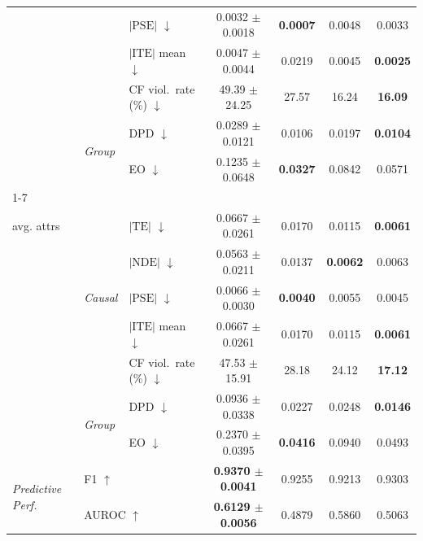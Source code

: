 \begin{table}[t]
\begin{tabular}{@{}lll cccc@{}}
  & & $|\mathrm{PSE}|$ $\downarrow$ & 0.0032 $\pm$ 0.0018 & \textbf{0.0007} & 0.0048 & 0.0033 \\
  & & $|\mathrm{ITE}|$ mean $\downarrow$ & 0.0047 $\pm$ 0.0044 & 0.0219 & 0.0045 & \textbf{0.0025} \\
  & & CF viol.\ rate (\%) $\downarrow$ & 49.39 $\pm$ 24.25 & 27.57 & 16.24 & \textbf{16.09} \\
  & \multirow{2}{*}{\scriptsize\textit{Group}} & DPD $\downarrow$ & 0.0289 $\pm$ 0.0121 & 0.0106 & 0.0197 & \textbf{0.0104} \\
  & & EO $\downarrow$ & 0.1235 $\pm$ 0.0648 & \textbf{0.0327} & 0.0842 & 0.0571 \\
\cmidrule(lr){1-7}
  \multirow{7}{*}{\makecell[l]{\textit{Overall}\\[-2pt]\scriptsize avg. attrs}} & \multirow{5}{*}{\scriptsize\textit{Causal}} & $|\mathrm{TE}|$ $\downarrow$ & 0.0667 $\pm$ 0.0261 & 0.0170 & 0.0115 & \textbf{0.0061} \\
  & & $|\mathrm{NDE}|$ $\downarrow$ & 0.0563 $\pm$ 0.0211 & 0.0137 & \textbf{0.0062} & 0.0063 \\
  & & $|\mathrm{PSE}|$ $\downarrow$ & 0.0066 $\pm$ 0.0030 & \textbf{0.0040} & 0.0055 & 0.0045 \\
  & & $|\mathrm{ITE}|$ mean $\downarrow$ & 0.0667 $\pm$ 0.0261 & 0.0170 & 0.0115 & \textbf{0.0061} \\
  & & CF viol.\ rate (\%) $\downarrow$ & 47.53 $\pm$ 15.91 & 28.18 & 24.12 & \textbf{17.12} \\
  & \multirow{2}{*}{\scriptsize\textit{Group}} & DPD $\downarrow$ & 0.0936 $\pm$ 0.0338 & 0.0227 & 0.0248 & \textbf{0.0146} \\
  & & EO $\downarrow$ & 0.2370 $\pm$ 0.0395 & \textbf{0.0416} & 0.0940 & 0.0493 \\
\midrule
\multirow{2}{*}{\textit{Predictive Perf.}} & \multicolumn{2}{l}{F1 $\uparrow$} & \textbf{0.9370 $\pm$ 0.0041} & 0.9255 & 0.9213 & 0.9303 \\
  & \multicolumn{2}{l}{AUROC $\uparrow$} & \textbf{0.6129 $\pm$ 0.0056} & 0.4879 & 0.5860 & 0.5063 \\
\bottomrule
\end{tabular}
\end{table}